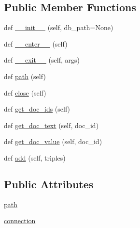 \subsection*{Public Member Functions}
\begin{DoxyCompactItemize}
\item 
def \hyperlink{classparlai_1_1agents_1_1tfidf__retriever_1_1doc__db_1_1DocDB_adfe0fe6cbf4503d95c40a0f5e61a623c}{\+\_\+\+\_\+init\+\_\+\+\_\+} (self, db\+\_\+path=None)
\item 
def \hyperlink{classparlai_1_1agents_1_1tfidf__retriever_1_1doc__db_1_1DocDB_a3fee5c8e1137575634540602d259c5b8}{\+\_\+\+\_\+enter\+\_\+\+\_\+} (self)
\item 
def \hyperlink{classparlai_1_1agents_1_1tfidf__retriever_1_1doc__db_1_1DocDB_af49bf8bf55469fe2dbd2d4d5f3e48ba9}{\+\_\+\+\_\+exit\+\_\+\+\_\+} (self, args)
\item 
def \hyperlink{classparlai_1_1agents_1_1tfidf__retriever_1_1doc__db_1_1DocDB_ae3e27c7f804ec3216553b963a0c4e570}{path} (self)
\item 
def \hyperlink{classparlai_1_1agents_1_1tfidf__retriever_1_1doc__db_1_1DocDB_a080619f722b8a5c83ec934d3d1391a01}{close} (self)
\item 
def \hyperlink{classparlai_1_1agents_1_1tfidf__retriever_1_1doc__db_1_1DocDB_adc970ff10e2070e93cc22f95ad03f8f1}{get\+\_\+doc\+\_\+ids} (self)
\item 
def \hyperlink{classparlai_1_1agents_1_1tfidf__retriever_1_1doc__db_1_1DocDB_a47aa0c10aa3f9693b2aa460953344d7e}{get\+\_\+doc\+\_\+text} (self, doc\+\_\+id)
\item 
def \hyperlink{classparlai_1_1agents_1_1tfidf__retriever_1_1doc__db_1_1DocDB_ae329b599aa42f545dc6108a4acdd266f}{get\+\_\+doc\+\_\+value} (self, doc\+\_\+id)
\item 
def \hyperlink{classparlai_1_1agents_1_1tfidf__retriever_1_1doc__db_1_1DocDB_a1396ab4ee21042e24c3b0ed022258071}{add} (self, triples)
\end{DoxyCompactItemize}
\subsection*{Public Attributes}
\begin{DoxyCompactItemize}
\item 
\hyperlink{classparlai_1_1agents_1_1tfidf__retriever_1_1doc__db_1_1DocDB_a9c5c8366fec3e2a732ae544fa29a70a6}{path}
\item 
\hyperlink{classparlai_1_1agents_1_1tfidf__retriever_1_1doc__db_1_1DocDB_aa4fdf07d873ad8779b1b8374adf74a26}{connection}
\end{DoxyCompactItemize}



